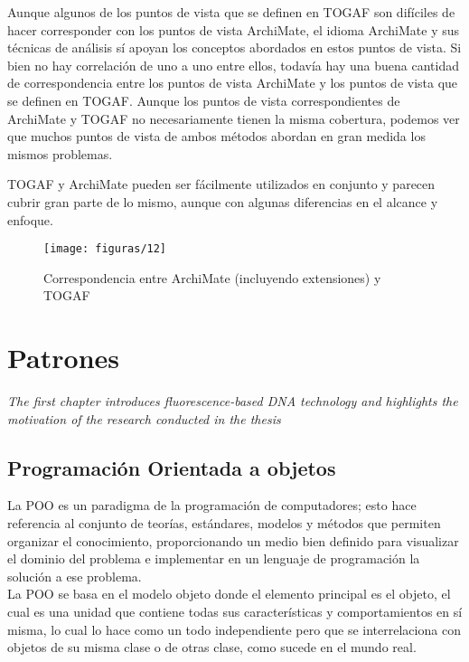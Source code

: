    Aunque algunos de los puntos de vista que se definen en TOGAF son difíciles de hacer corresponder con los puntos de vista ArchiMate, el idioma ArchiMate y sus técnicas de análisis sí apoyan los conceptos abordados en estos puntos de vista. Si bien no hay correlación de uno a uno entre ellos, todavía hay una buena cantidad de correspondencia entre los puntos de vista ArchiMate y los puntos de vista que se definen en TOGAF. Aunque los puntos de vista correspondientes de ArchiMate y TOGAF no necesariamente tienen la misma cobertura, podemos ver que muchos puntos de vista de ambos métodos abordan en gran medida los mismos problemas.
   
   TOGAF y ArchiMate pueden ser fácilmente utilizados en conjunto y parecen cubrir gran parte de lo mismo, aunque con algunas diferencias en el alcance y enfoque.
   
     \begin{figure}[H]
     	\centering
     	\texttt{[image: figuras/12]}
     	\captionsetup{width=.95\textwidth}
     	\caption{Correspondencia entre ArchiMate (incluyendo extensiones) y TOGAF}
     	\label{figura12}
     \end{figure}

\chapter{Patrones}
\label{chap:patrones}
\textit{The first chapter introduces fluorescence-based DNA technology and highlights the motivation of the research conducted in the thesis}
\vfill
\minitoc
\newpage

\section{Programación Orientada a objetos}
La POO es un paradigma de la programación de computadores; esto hace referencia al conjunto de teorías, estándares, modelos y métodos que permiten organizar el conocimiento, proporcionando un medio bien definido para visualizar el dominio del problema e implementar en un lenguaje de programación la solución a ese problema. \\

La POO se basa en el modelo objeto donde el elemento principal es el objeto, el cual es una unidad que contiene todas sus características y comportamientos en sí misma, lo cual lo hace como un todo independiente pero que se interrelaciona con objetos de su misma clase o de otras clase, como sucede en el mundo real. \\

